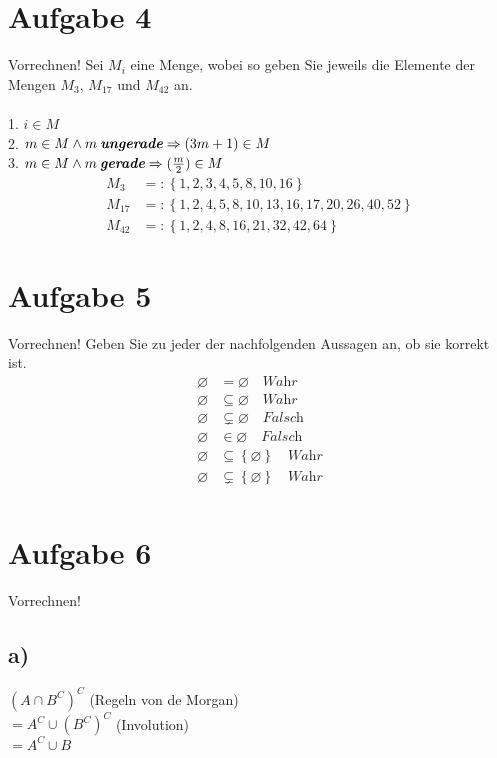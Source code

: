 \documentclass[paper = a4, ngerman]{scrartcl}
\begin{document}
\section*{Aufgabe 4} Vorrechnen!
Sei $M_i$ eine Menge, wobei  so geben Sie jeweils die Elemente der Mengen $M_3$, $M_{17}$ und $M_{42}$ an.\\\\
	1. $ i \in M$\\
	2. $m \in M \land m\: \textit{\textbf{ungerade}} \Rightarrow (3m+1) \in M$\\
	3. $m \in M \land m\: \textit{\textbf{gerade}} \Rightarrow (\frac{m}{2}) \in M$
		\begin{align*}
			M_3 &=: \left\{1,2,3,4,5,8,10,16\right\}\\
			M_{17} &=: \left\{1,2,4,5,8,10,13,16,17,20,26,40,52\right\}\\
			M_{42} &=: \left\{1,2,4,8,16,21,32,42,64\right\}
		\end{align*}
		
		
\section*{Aufgabe 5} Vorrechnen!
	 Geben Sie zu jeder der nachfolgenden Aussagen an, ob sie korrekt ist.
		\begin{align*}
			\varnothing &= \varnothing \quad \textit{Wahr}\\
			\varnothing &\subseteq \varnothing \quad \textit{Wahr}\\
			\varnothing &\subsetneq \varnothing \quad \textit{Falsch}\\
			\varnothing &\in \varnothing \quad \textit{Falsch}\\
			\varnothing &\subseteq \left\{\varnothing\right\} \quad \textit{Wahr}\\
			\varnothing &\subsetneq \left\{\varnothing\right\} \quad \textit{Wahr}\\
		\end{align*}
		
\pagebreak

\section*{Aufgabe 6} Vorrechnen!

\subsection*{a)}
$(A \cap B^C)^C$ (Regeln von de Morgan)\\
$= A^C \cup (B^C)^C$ (Involution)\\
$= A^C \cup B$\\
\end{document}
